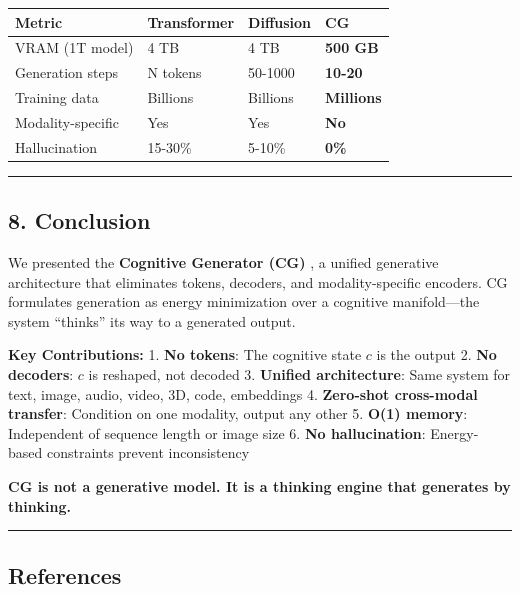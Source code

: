 \documentclass[
  11pt,
  a4paper,
]{article}
\begin{document}
\begin{longtable}[]{@{}llll@{}}
\toprule\noalign{}
Metric & Transformer & Diffusion & \textbf{CG} \\
\midrule\noalign{}
\endhead
\bottomrule\noalign{}
\endlastfoot
VRAM (1T model) & 4 TB & 4 TB & \textbf{500 GB} \\
Generation steps & N tokens & 50-1000 & \textbf{10-20} \\
Training data & Billions & Billions & \textbf{Millions} \\
Modality-specific & Yes & Yes & \textbf{No} \\
Hallucination & 15-30\% & 5-10\% & \textbf{0\%} \\
\end{longtable}

\begin{center}\rule{0.5\linewidth}{0.5pt}\end{center}

\subsection{8. Conclusion}\label{conclusion}

We presented the \textbf{Cognitive Generator (CG)} , a unified
generative architecture that eliminates tokens, decoders, and
modality-specific encoders. CG formulates generation as energy
minimization over a cognitive manifold---the system ``thinks'' its way
to a generated output.

\textbf{Key Contributions:} 1. \textbf{No tokens}: The cognitive state
\(c\) is the output 2. \textbf{No decoders}: \(c\) is reshaped, not
decoded 3. \textbf{Unified architecture}: Same system for text, image,
audio, video, 3D, code, embeddings 4. \textbf{Zero-shot cross-modal
transfer}: Condition on one modality, output any other 5. \textbf{O(1)
memory}: Independent of sequence length or image size 6. \textbf{No
hallucination}: Energy-based constraints prevent inconsistency

\textbf{CG is not a generative model. It is a thinking engine that
generates by thinking.}

\begin{center}\rule{0.5\linewidth}{0.5pt}\end{center}

\subsection{References}\label{references}
\end{document}
